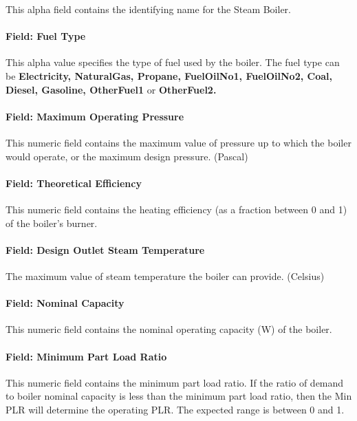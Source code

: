 This alpha field contains the identifying name for the Steam Boiler.

\paragraph{Field: Fuel Type}\label{field-fuel-type-4}

This alpha value specifies the type of fuel used by the boiler. The fuel type can be \textbf{Electricity, NaturalGas, Propane, FuelOilNo1, FuelOilNo2, Coal, Diesel, Gasoline, OtherFuel1} or \textbf{OtherFuel2.}

\paragraph{Field: Maximum Operating Pressure}\label{field-maximum-operating-pressure}

This numeric field contains the maximum value of pressure up to which the boiler would operate, or the maximum design pressure. (Pascal)

\paragraph{Field: Theoretical Efficiency}\label{field-theoretical-efficiency}

This numeric field contains the heating efficiency (as a fraction between 0 and 1) of the boiler's burner.

\paragraph{Field: Design Outlet Steam Temperature}\label{field-design-outlet-steam-temperature}

The maximum value of steam temperature the boiler can provide. (Celsius)

\paragraph{Field: Nominal Capacity}\label{field-nominal-capacity-7}

This numeric field contains the nominal operating capacity (W) of the boiler.

\paragraph{Field: Minimum Part Load Ratio}\label{field-minimum-part-load-ratio-10}

This numeric field contains the minimum part load ratio. If the ratio of demand to boiler nominal capacity is less than the minimum part load ratio, then the Min PLR will determine the operating PLR. The expected range is between 0 and 1.

